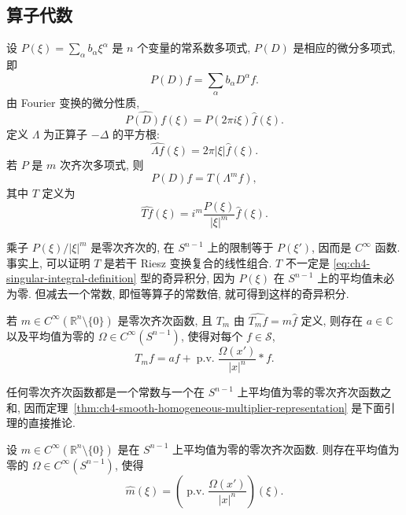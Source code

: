 \subsection{算子代数}
\label{sec:ch4-operator-algebra}

设 $P(\xi)=\sum_\alpha b_\alpha\xi^\alpha$ 是 $n$ 个变量的常系数多项式, $P(D)$ 是相应的微分多项式, 即
\[
 P(D)f=\sum_\alpha b_\alpha D^\alpha f.
\]
由 Fourier 变换的微分性质,
\[
 \widehat{P(D)f}(\xi)=P(2\pi i\xi)\widehat f(\xi).
\]
定义 $\Lambda$ 为正算子 $-\Delta$ 的平方根:
\begin{equation}
\label{eq:ch4-lambda-definition}
 \widehat{\Lambda f}(\xi)=2\pi|\xi|\widehat f(\xi).
\end{equation}
若 $P$ 是 $m$ 次齐次多项式, 则
\begin{equation}
\label{eq:ch4-differential-operator-factorization}
 P(D)f=T(\Lambda^mf),
\end{equation}
其中 $T$ 定义为
\[
 \widehat{Tf}(\xi)=i^m\frac{P(\xi)}{|\xi|^m}\widehat f(\xi).
\]

\hypertarget{chapter-04-page-093}{}
乘子 $P(\xi)/|\xi|^m$ 是零次齐次的, 在 $S^{n-1}$ 上的限制等于 $P(\xi')$, 因而是 $C^\infty$ 函数. 事实上, 可以证明 $T$ 是若干 Riesz 变换复合的线性组合. $T$ 不一定是 \eqref{eq:ch4-singular-integral-definition} 型的奇异积分, 因为 $P(\xi)$ 在 $S^{n-1}$ 上的平均值未必为零. 但减去一个常数, 即恒等算子的常数倍, 就可得到这样的奇异积分.

\begin{Theorem}
\label{thm:ch4-smooth-homogeneous-multiplier-representation}
若 $m\in C^\infty(\mathbb R^n\setminus\{0\})$ 是零次齐次函数, 且 $T_m$ 由 $\widehat{T_mf}=m\widehat f$ 定义, 则存在 $a\in\mathbb C$ 以及平均值为零的 $\Omega\in C^\infty(S^{n-1})$, 使得对每个 $f\in\mathcal S$,
\[
 T_mf=af+\operatorname{p.v.}\frac{\Omega(x')}{|x|^n}*f.
\]
\end{Theorem}

任何零次齐次函数都是一个常数与一个在 $S^{n-1}$ 上平均值为零的零次齐次函数之和, 因而定理~\ref{thm:ch4-smooth-homogeneous-multiplier-representation} 是下面引理的直接推论.

\begin{Lemma}
\label{lem:ch4-zero-mean-multiplier-kernel}
设 $m\in C^\infty(\mathbb R^n\setminus\{0\})$ 是在 $S^{n-1}$ 上平均值为零的零次齐次函数. 则存在平均值为零的 $\Omega\in C^\infty(S^{n-1})$, 使得
\[
 \widehat m(\xi)=\left(\operatorname{p.v.}
 \frac{\Omega(x')}{|x|^n}\right)(\xi).
\]
\end{Lemma}

